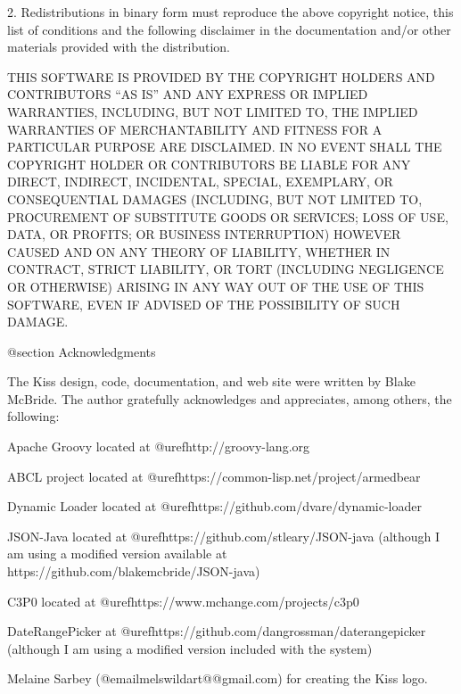 2. Redistributions in binary form must reproduce the above copyright
notice, this list of conditions and the following disclaimer in the
documentation and/or other materials provided with the distribution.

THIS SOFTWARE IS PROVIDED BY THE COPYRIGHT HOLDERS AND CONTRIBUTORS
``AS IS'' AND ANY EXPRESS OR IMPLIED WARRANTIES, INCLUDING, BUT NOT
LIMITED TO, THE IMPLIED WARRANTIES OF MERCHANTABILITY AND FITNESS FOR
A PARTICULAR PURPOSE ARE DISCLAIMED. IN NO EVENT SHALL THE COPYRIGHT
HOLDER OR CONTRIBUTORS BE LIABLE FOR ANY DIRECT, INDIRECT, INCIDENTAL,
SPECIAL, EXEMPLARY, OR CONSEQUENTIAL DAMAGES (INCLUDING, BUT NOT
LIMITED TO, PROCUREMENT OF SUBSTITUTE GOODS OR SERVICES; LOSS OF USE,
DATA, OR PROFITS; OR BUSINESS INTERRUPTION) HOWEVER CAUSED AND ON ANY
THEORY OF LIABILITY, WHETHER IN CONTRACT, STRICT LIABILITY, OR TORT
(INCLUDING NEGLIGENCE OR OTHERWISE) ARISING IN ANY WAY OUT OF THE USE
OF THIS SOFTWARE, EVEN IF ADVISED OF THE POSSIBILITY OF SUCH DAMAGE.

@section Acknowledgments

The Kiss design, code, documentation, and web site were written by
Blake McBride.  The author gratefully acknowledges and appreciates,
among others, the following:


Apache Groovy located at @uref{http://groovy-lang.org}

ABCL project located at @uref{https://common-lisp.net/project/armedbear}

Dynamic Loader located at @uref{https://github.com/dvare/dynamic-loader}

JSON-Java located at @uref{https://github.com/stleary/JSON-java} (although
I am using a modified version available at https://github.com/blakemcbride/JSON-java)

C3P0 located at @uref{https://www.mchange.com/projects/c3p0}

DateRangePicker at @uref{https://github.com/dangrossman/daterangepicker} (although
I am using a modified version included with the system)

Melaine Sarbey (@email{melswildart@@gmail.com}) for creating the Kiss logo.

